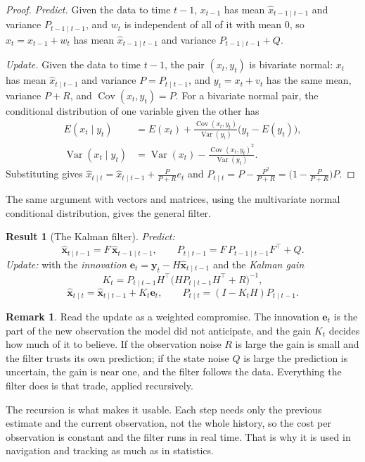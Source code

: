 \documentclass[11pt,a4paper]{article}
\theoremstyle{definition}
\newtheorem{result}[thm]{Result}
\newtheorem*{remark}{Remark}
\DeclareMathOperator{\Var}{Var}
\DeclareMathOperator{\Cov}{Cov}
\begin{document}
\begin{proof}
\emph{Predict.} Given the data to time $t - 1$, $x_{t-1}$ has mean $\hat x_{t-1\mid t-1}$ and variance $P_{t-1\mid t-1}$, and $w_t$ is independent of all of it with
mean $0$, so $x_t = x_{t-1} + w_t$ has mean $\hat x_{t-1\mid t-1}$ and variance $P_{t-1\mid t-1} + Q$.

\emph{Update.} Given the data to time $t - 1$, the pair $(x_t, y_t)$ is bivariate normal: $x_t$ has mean $\hat x_{t\mid t-1}$ and variance $P = P_{t\mid t-1}$, and
$y_t = x_t + v_t$ has the same mean, variance $P + R$, and $\Cov(x_t, y_t) = P$. For a bivariate normal pair, the conditional
distribution of one variable given the other has
\begin{align*}
E(x_t \mid y_t) &= E(x_t) + \frac{\Cov(x_t, y_t)}{\Var(y_t)}\bigl(y_t - E(y_t)\bigr) , \\
\Var(x_t \mid y_t) &= \Var(x_t) - \frac{\Cov(x_t, y_t)^2}{\Var(y_t)} .
\end{align*}
Substituting gives $\hat x_{t\mid t} = \hat x_{t\mid t-1} + \frac{P}{P+R}e_t$ and $P_{t\mid t} = P - \frac{P^2}{P+R} = \bigl(1 - \frac{P}{P+R}\bigr)P$.
\end{proof}

The same argument with vectors and matrices, using the multivariate normal conditional distribution, gives
the general filter.

\begin{result}[The Kalman filter]
\emph{Predict:}
\[
\hat{\mathbf{x}}_{t\mid t-1} = F\,\hat{\mathbf{x}}_{t-1\mid t-1} , \qquad P_{t\mid t-1} = F\,P_{t-1\mid t-1}F^\top + Q .
\]
\emph{Update:} with the \emph{innovation} $\mathbf{e}_t = \mathbf{y}_t - H\hat{\mathbf{x}}_{t\mid t-1}$ and the \emph{Kalman gain}
\[
K_t = P_{t\mid t-1}H^\top\bigl(HP_{t\mid t-1}H^\top + R\bigr)^{-1} ,
\]
\[
\hat{\mathbf{x}}_{t\mid t} = \hat{\mathbf{x}}_{t\mid t-1} + K_t\mathbf{e}_t , \qquad P_{t\mid t} = (I - K_tH)P_{t\mid t-1} .
\]
\end{result}

\begin{remark}
Read the update as a weighted compromise. The innovation $\mathbf{e}_t$ is the part of the new observation the model did not
anticipate, and the gain $K_t$ decides how much of it to believe. If the observation noise $R$ is large the gain is small
and the filter trusts its own prediction; if the state noise $Q$ is large the prediction is uncertain, the gain is near one,
and the filter follows the data. Everything the filter does is that trade, applied recursively.

The recursion is what makes it usable. Each step needs only the previous estimate and the current
observation, not the whole history, so the cost per observation is constant and the filter runs in real time.
That is why it is used in navigation and tracking as much as in statistics.
\end{remark}
\end{document}
